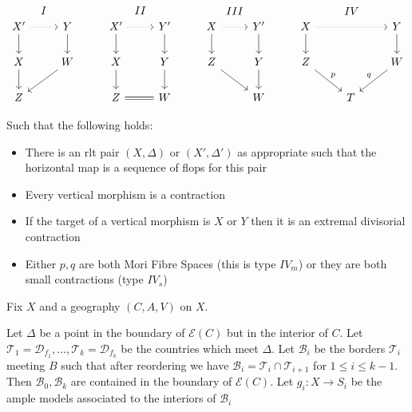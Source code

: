 \[\begin{tikzcd}
X' \arrow[d] \arrow[r, dotted] \arrow[r, "I", phantom, bend left=49] & Y \arrow[d]  & X' \arrow[r, dotted] \arrow[d] \arrow[r, "II",phantom, bend left=49] & Y' \arrow[d] & X \arrow[r, dotted] \arrow[d] \arrow[r, "III", phantom, bend left=49] & Y' \arrow[d] & X \arrow[d] \arrow[rr, dotted] \arrow[rr, "IV",phantom, bend left] &   & Y \arrow[d]       \\
X \arrow[d]                                                          & W \arrow[ld] & X \arrow[d]                                               & Y \arrow[d]  & Z \arrow[rd]                                              & Y \arrow[d]  & Z \arrow[rd, "p"]                                          &   & W \arrow[ld, "q"'] \\
Z                                                                    &              & Z \arrow[r, equal]                                                         & W            &                                                           & W            &                                                            & T &                  
\end{tikzcd} \]


Such that the following holds:
\begin{itemize}
	\item There is an rlt pair $(X,\Delta)$ or $(X',\Delta')$ as appropriate such that the horizontal map is a sequence of flops for this pair
	\item Every vertical morphism is a contraction
	\item If the target of a vertical morphism is $X$ or $Y$ then it is an extremal divisorial contraction
	\item Either $p,q$ are both Mori Fibre Spaces (this is type $IV_{m}$) or they are both small contractions (type $IV_{s}$)
\end{itemize}



Fix $X$ and a geography $(C,A,V)$ on $X$.

Let $\Delta$ be a point in the boundary of $\mathcal{E}(C)$ but in the interior of $C$. Let $\mathcal{T}_{1}=\mathcal{D}_{f_{1}},..., \mathcal{T}_{k}=\mathcal{D}_{f_{k}}$ be the countries which meet $\Delta$. Let $\mathcal{B}_{i}$ be the borders $\mathcal{T}_{i}$ meeting $B$ such that after reordering we have $\mathcal{B}_{i}=\mathcal{T}_{i}\cap \mathcal{T}_{i+1}$ for $1 \leq i \leq k-1$. Then $\mathcal{B}_{0}, \mathcal{B}_{k}$ are contained in the boundary of $\mathcal{E}(C)$. Let $g_{i}:X \to S_{i}$ be the ample models associated to the interiors of $\mathcal{B}_{i}$

